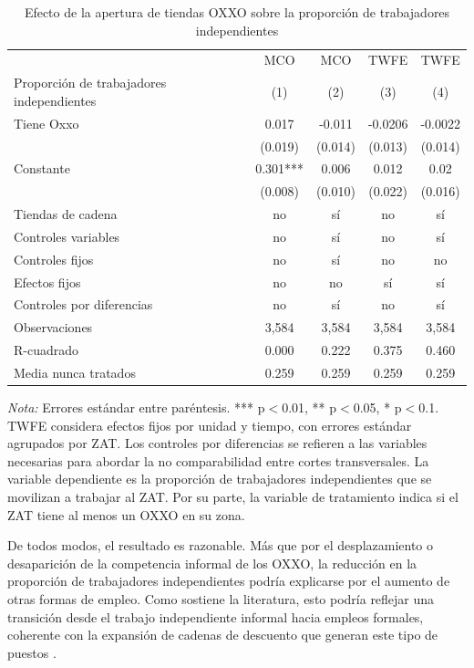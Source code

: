\documentclass{article}
\begin{document}
\begin{table}[H]
\centering
\caption{Efecto de la apertura de tiendas OXXO sobre la proporción de trabajadores independientes}
\label{tab:resultados_regresion}
\begin{tabular}{lcccc}
\hline
\hline
 & MCO & MCO & TWFE & TWFE \\
Proporción de trabajadores independientes & (1) & (2) & (3) & (4) \\
\hline
Tiene Oxxo & 0.017 & -0.011 & -0.0206 & -0.0022 \\
 & (0.019) & (0.014) & (0.013) & (0.014) \\
Constante & 0.301*** & 0.006 & 0.012 & 0.02 \\
 & (0.008) & (0.010) & (0.022) & (0.016) \\
\hline
Tiendas de cadena & no & sí & no & sí \\
Controles variables & no & sí & no & sí \\
Controles fijos & no & sí & no & no \\
Efectos fijos & no & no & sí & sí \\
Controles por diferencias & no & sí & no & sí \\
Observaciones & 3,584 & 3,584 & 3,584 & 3,584 \\
R-cuadrado & 0.000 & 0.222 & 0.375 & 0.460 \\
Media nunca tratados & 0.259 & 0.259 & 0.259 & 0.259 \\
\hline
\end{tabular}
\parbox[t]{\textwidth}{%
\vspace{0.5em}
\footnotesize{\textit{Nota:} Errores estándar entre paréntesis. *** p$<$0.01, ** p$<$0.05, * p$<$0.1.  
TWFE considera efectos fijos por unidad y tiempo, con errores estándar agrupados por ZAT. 
Los controles por diferencias se refieren a las variables necesarias para abordar la no comparabilidad entre cortes transversales.
La variable dependiente es la proporción de trabajadores independientes que se movilizan a trabajar al ZAT. 
Por su parte, la variable de tratamiento indica si el ZAT tiene al menos un OXXO en su zona.
}}
\end{table}

De todos modos, el resultado es razonable. Más que por el desplazamiento o desaparición de la competencia informal de los OXXO, la reducción en la proporción de trabajadores independientes podría explicarse por el aumento de otras formas de empleo. 
Como sostiene la literatura, esto podría reflejar una transición desde el trabajo independiente informal hacia empleos formales, coherente con la expansión de cadenas de descuento que generan este tipo de puestos \parencite{delgado2024,Seong2022}. \\
\end{document}

